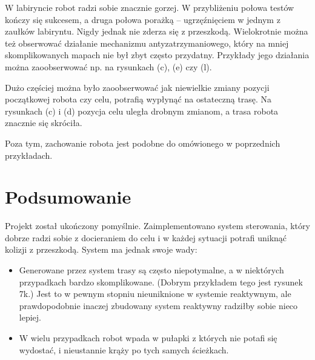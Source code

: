 \documentclass[11pt]{article}
\begin{document}
W labiryncie robot radzi sobie znacznie gorzej. W przybliżeniu połowa testów kończy się sukcesem, a druga połowa porażką -- ugrzęźnięciem w jednym z zaułków labiryntu. Nigdy jednak nie zderza się z przeszkodą. Wielokrotnie można też obserwować działanie mechanizmu antyzatrzymaniowego, który na mniej skomplikowanych mapach nie był zbyt często przydatny. Przykłady jego działania można zaoobserwować np. na rysunkach (c), (e) czy (l).

Dużo częściej można było zaoobserwować jak niewielkie zmiany pozycji początkowej robota czy celu, potrafią wypłynąć na ostateczną trasę. Na rysunkach (c) i (d) pozycja celu uległa drobnym zmianom, a trasa robota znacznie się skróciła.

Poza tym, zachowanie robota jest podobne do omówionego w poprzednich przykładach.

%	
%	

\newpage

\section{Podsumowanie}

Projekt został ukończony pomyślnie. Zaimplementowano system sterowania, który dobrze radzi sobie z docieraniem do celu i w każdej sytuacji potrafi uniknąć kolizji z przeszkodą. System ma jednak swoje wady:
\begin{itemize}[--]
\item Generowane przez system trasy są często niepotymalne, a w niektórych przypadkach bardzo skomplikowane. (Dobrym przykładem tego jest rysunek 7k.) Jest to w pewnym stopniu nieuniknione w systemie reaktywnym, ale prawdopodobnie inaczej zbudowany system reaktywny radziłby sobie nieco lepiej.
\item W wielu przypadkach robot wpada w pułapki z których nie potafi się wydostać, i nieustannie krąży po tych samych ścieżkach.
\end{itemize}
\end{document}
